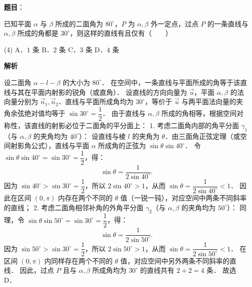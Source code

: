 \begin{answer}

\textbf{题目}：

已知平面 $\alpha$ 与 $\beta$ 所成的二面角为 $80^\circ$，$P$ 为 $\alpha, \beta$ 外一定点，过点 $P$ 的一条直线与 $\alpha, \beta$ 所成的角都是 $30^\circ$，则这样的直线有且仅有\mbox{（　　）}

\begin{gkopts}(4)
\task A．$1$ 条
\task B．$2$ 条
\task C．$3$ 条
\task D．$4$ 条
\end{gkopts}

\textbf{解析}

设二面角 $\alpha - l - \beta$ 的大小为 $80^\circ$．
在空间中，一条直线与平面所成的角等于该直线与其在平面内射影的锐角（或直角）．
设直线的方向向量为 $\vec{u}$，平面 $\alpha, \beta$ 的法向量分别为 $\vec{n}_1, \vec{n}_2$．直线与平面所成角均为 $30^\circ$，等价于 $\vec{u}$ 与两平面法向量的夹角余弦绝对值均等于 $\sin 30^\circ = \dfrac{1}{2}$．
由于直线与 $\alpha, \beta$ 所成的角相等，根据空间对称性，该直线的射影必位于二面角的平分面上：
1. 考虑二面角内部的角平分面 $\gamma_1$（与 $\alpha, \beta$ 的夹角均为 $40^\circ$）：
   设直线与棱 $l$ 的夹角为 $\theta$．由三面角正弦定理（或空间射影角公式），直线与平面 $\alpha$ 所成角的正弦为 $\sin\theta \sin 40^\circ$．
   令 $\sin\theta \sin 40^\circ = \sin 30^\circ = \dfrac{1}{2}$，得：
\nopagebreak[4]
\[
\sin\theta = \frac{1}{2\sin 40^\circ}.
\]
   因为 $\sin 40^\circ > \sin 30^\circ = \dfrac{1}{2}$，所以 $2\sin 40^\circ > 1$，从而 $\sin\theta = \dfrac{1}{2\sin 40^\circ} < 1$．
   因此在区间 $(0, \pi)$ 内存在两个不同的 $\theta$ 值（一锐一钝），对应空间中两条不同斜率的直线；
2. 考虑二面角相邻补角的外角平分面 $\gamma_2$（与 $\alpha, \beta$ 的夹角均为 $50^\circ$）：
   同理，令 $\sin\theta \sin 50^\circ = \sin 30^\circ = \dfrac{1}{2}$，得：
\nopagebreak[4]
\[
\sin\theta = \frac{1}{2\sin 50^\circ}.
\]
   因为 $\sin 50^\circ > \sin 30^\circ = \dfrac{1}{2}$，所以 $2\sin 50^\circ > 1$，从而 $\sin\theta = \dfrac{1}{2\sin 50^\circ} < 1$．
   在区间 $(0, \pi)$ 内同样存在两个不同的 $\theta$ 值，对应空间中另外两条不同斜率的直线．
因此，过点 $P$ 且与 $\alpha, \beta$ 所成角均为 $30^\circ$ 的直线共有 $2 + 2 = 4$ 条．
故选 D．


\end{answer}

